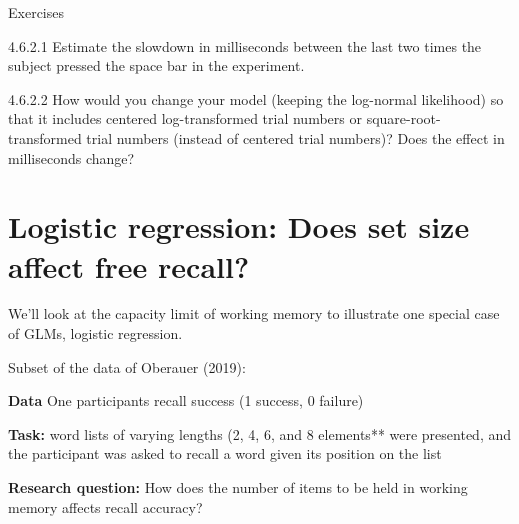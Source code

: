 \documentclass[12pt,ignorenonframetext,aspectratio=169]{beamer}
\begin{document}
\begin{frame}

\begin{block}{\color{blue} Exercises}

4.6.2.1 Estimate the slowdown in milliseconds between the last two times the subject pressed the space bar in the experiment.

4.6.2.2 How would you change your model (keeping the log-normal likelihood) so that it includes centered log-transformed trial numbers or square-root-transformed trial numbers (instead of centered trial numbers)? Does the effect in milliseconds change?

\end{block}

\end{frame}

\hypertarget{sec:logistic}{%
\section{Logistic regression: Does set size affect free recall?}\label{sec:logistic}}

\begin{frame}

We'll look at the capacity limit of working memory to illustrate one special case of GLMs, logistic regression.

Subset of the data of Oberauer (2019):

\textbf{Data}
One participants recall success (1 success, 0 failure)

\textbf{Task:}
word lists of varying lengths (2, 4, 6, and 8 elements** were presented, and the participant was asked to recall a word given its position on the list

\textbf{Research question:}
How does the number of items to be held in working memory affects recall accuracy?

\end{frame}
\end{document}

